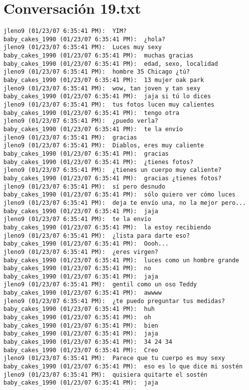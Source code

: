 \section{Conversaci\'on 19.txt}

\begin{verbatim}
jleno9 (01/23/07 6:35:41 PM):  YIM?
baby_cakes_1990 (01/23/07 6:35:41 PM):  ¿hola?
jleno9 (01/23/07 6:35:41 PM):  Luces muy sexy
baby_cakes_1990 (01/23/07 6:35:41 PM):  muchas gracias
baby_cakes_1990 (01/23/07 6:35:41 PM):  edad, sexo, localidad
jleno9 (01/23/07 6:35:41 PM):  hombre 35 Chicago ¿tú?
baby_cakes_1990 (01/23/07 6:35:41 PM):  13 mujer oak park
jleno9 (01/23/07 6:35:41 PM):  wow, tan joven y tan sexy
baby_cakes_1990 (01/23/07 6:35:41 PM):  jaja si tú lo dices
jleno9 (01/23/07 6:35:41 PM):  tus fotos lucen muy calientes
baby_cakes_1990 (01/23/07 6:35:41 PM):  tengo otra
jleno9 (01/23/07 6:35:41 PM):  ¿puedo verla?
baby_cakes_1990 (01/23/07 6:35:41 PM):  te la envío
jleno9 (01/23/07 6:35:41 PM):  gracias
jleno9 (01/23/07 6:35:41 PM):  Diablos, eres muy caliente
baby_cakes_1990 (01/23/07 6:35:41 PM):  gracias
baby_cakes_1990 (01/23/07 6:35:41 PM):  ¿tienes fotos?
jleno9 (01/23/07 6:35:41 PM):  ¿tienes un cuerpo muy caliente?
baby_cakes_1990 (01/23/07 6:35:41 PM):  gracias ¿tienes fotos?
jleno9 (01/23/07 6:35:41 PM):  sí pero desnudo
baby_cakes_1990 (01/23/07 6:35:41 PM):  sólo quiero ver cómo luces
jleno9 (01/23/07 6:35:41 PM):  deja te envío una, no la mejor pero...
baby_cakes_1990 (01/23/07 6:35:41 PM):  jaja
jleno9 (01/23/07 6:35:41 PM):  te la envío
baby_cakes_1990 (01/23/07 6:35:41 PM):  la estoy recibiendo
jleno9 (01/23/07 6:35:41 PM):  ¿lista para darte eso?
baby_cakes_1990 (01/23/07 6:35:41 PM):  Oooh... 
jleno9 (01/23/07 6:35:41 PM):  ¿eres virgen?
baby_cakes_1990 (01/23/07 6:35:41 PM):  luces como un hombre grande
baby_cakes_1990 (01/23/07 6:35:41 PM):  no
baby_cakes_1990 (01/23/07 6:35:41 PM):  jaja
jleno9 (01/23/07 6:35:41 PM):  gentil como un oso Teddy
baby_cakes_1990 (01/23/07 6:35:41 PM):  awwww
jleno9 (01/23/07 6:35:41 PM):  ¿te puedo preguntar tus medidas?
baby_cakes_1990 (01/23/07 6:35:41 PM):  huh
baby_cakes_1990 (01/23/07 6:35:41 PM):  oh
baby_cakes_1990 (01/23/07 6:35:41 PM):  bien
baby_cakes_1990 (01/23/07 6:35:41 PM):  jaja
baby_cakes_1990 (01/23/07 6:35:41 PM):  34 24 34
baby_cakes_1990 (01/23/07 6:35:41 PM):  Creo
jleno9 (01/23/07 6:35:41 PM):  Parece que tu cuerpo es muy sexy
baby_cakes_1990 (01/23/07 6:35:41 PM):  eso es lo que dice mi sostén
jleno9 (01/23/07 6:35:41 PM):  quisiera quitarte el sostén
baby_cakes_1990 (01/23/07 6:35:41 PM):  jaja

\end{verbatim}
